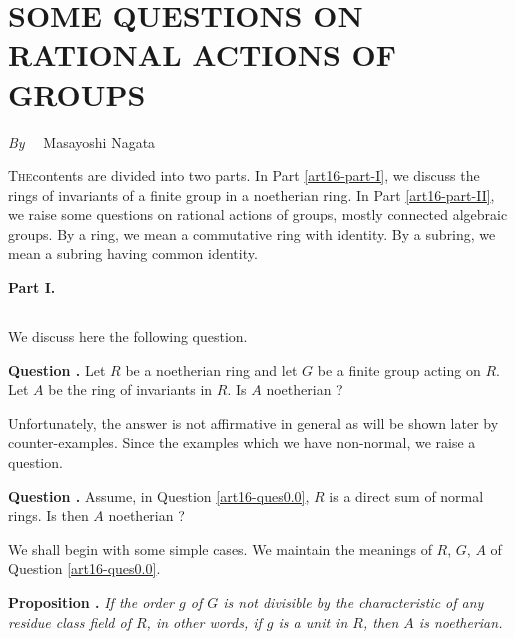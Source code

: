 \chapter[\textsc{M. Nagata~:} Some Questions on Rational Actions of Groups]{SOME QUESTIONS ON RATIONAL ACTIONS OF GROUPS}\label{art16}

\begin{center}
{\em By}~~ Masayoshi Nagata
\end{center}


\setcounter{pageoriginal}{322}
\textsc{The}\pageoriginale contents are divided into two parts. In Part \ref{art16-part-I}, we discuss the rings of invariants of a finite group in a noetherian ring. In Part \ref{art16-part-II}, we raise some questions on rational actions of groups, mostly connected algebraic groups. By a ring, we mean a commutative ring with identity. By a subring, we mean a subring having common identity.

\bigskip
\begin{center}
{\bf\Large Part I.}
\end{center}

\setcounter{section}{-1}
\section{} We discuss here the following question.

\medskip

\noindent
{\bf Question .\label{art16-ques0.0}}
Let $R$ be a noetherian ring and let $G$ be a finite group acting on $R$. Let $A$ be the ring of invariants in $R$. Is $A$ noetherian ?


Unfortunately, the answer is not affirmative in general as will be shown later by counter-examples. Since the examples which we have non-normal, we raise a question.

\medskip
\noindent
{\bf Question .\label{art16-ques0.1}}
Assume, in Question \ref{art16-ques0.0}, $R$ is a direct sum of normal rings. Is then $A$ noetherian ?
\smallskip

We shall begin with some simple cases. We maintain the meanings of $R$, $G$, $A$ of Question \ref{art16-ques0.0}.

\medskip
\noindent
{\bf Proposition .\label{art16-prop0.2}}
{\em If the order $g$ of $G$ is not divisible by the characteristic of any residue class field of $R$, in other words, if $g$ is a unit in $R$, then $A$ is noetherian.}

